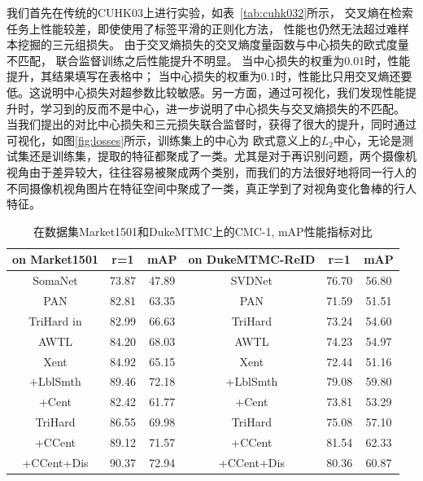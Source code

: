 我们首先在传统的CUHK03上进行实验，如表~\ref{tab:cuhk032}所示，
 交叉熵在检索任务上性能较差，即使使用了标签平滑的正则化方法，
性能也仍然无法超过难样本挖掘的三元组损失。
由于交叉熵损失的交叉熵度量函数与中心损失的欧式度量不匹配，
联合监督训练之后性能提升不明显。
当中心损失的权重为0.01时，性能提升，其结果填写在表格中；
当中心损失的权重为0.1时，性能比只用交叉熵还要低。这说明中心损失对超参数比较敏感。另一方面，通过可视化，我们发现性能提升时，学习到的反而不是中心，进一步说明了中心损失与交叉熵损失的不匹配。 
当我们提出的对比中心损失和三元损失联合监督时，获得了很大的提升，同时通过可视化，如图\ref{fig:losses}所示，训练集上的中心为
欧式意义上的$L_2$中心，无论是测试集还是训练集，提取的特征都聚成了一类。尤其是对于再识别问题，两个摄像机视角由于差异较大，往往容易被聚成两个类别，而我们的方法很好地将同一行人的不同摄像机视角图片在特征空间中聚成了一类，真正学到了对视角变化鲁棒的行人特征。

\begin{table}
	\centering
	\caption{在数据集Market1501和DukeMTMC上的CMC-1, mAP性能指标对比}
	\label{tab:market2}
	\begin{tabular}{c|cc||c|cc}
		\hline
		on Market1501                          & r=1   & mAP   & on DukeMTMC-ReID & r=1   & mAP   \\ \hline 
		SomaNet \cite{zheng2017ped}            & 73.87 & 47.89 & SVDNet           & 76.70 & 56.80 \\ 
		PAN \cite{barbosa2017looking}          & 82.81 & 63.35 & PAN              & 71.59 & 51.51 \\  
		TriHard in \cite{hermans2017defense}   & 82.99 & 66.63 & TriHard          & 73.24 & 54.60 \\ 
		AWTL        \cite{ristani2018features} & 84.20 & 68.03 & AWTL             & 74.23 & 54.97 \\ \hline  \hline 
		Xent                                   & 84.92 & 65.15 & Xent             & 72.44 & 51.16 \\ 
		+LblSmth                               & 89.46 & 72.18 & +LblSmth         &   79.08 & 59.80      \\ 
		+Cent                                  & 82.42 & 61.77 & +Cent            &  73.81     &  53.29     \\ 
		TriHard                                & 86.55 & 69.98 & TriHard          & 75.08 & 57.10 \\
		+CCent                                 & 89.12 & 71.57 & +CCent           &  81.54     &  62.33     \\
		+CCent+Dis                             &  90.37     & 72.94      & +CCent+Dis       &   80.36    &  60.87     \\  \hline 
	\end{tabular}
\end{table}

